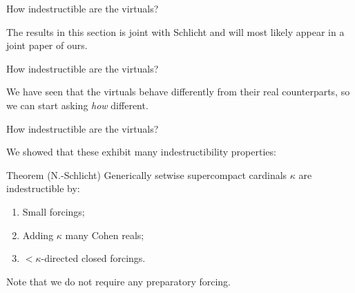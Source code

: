 \documentclass{beamer}
\begin{document}
\begin{frame}{How indestructible are the virtuals?}

  The results in this section is joint with \alert{Schlicht} and will most likely appear in a joint paper of ours.

\end{frame}

\begin{frame}{How indestructible are the virtuals?}

  We have seen that the virtuals behave differently from their real counterparts, so we can start asking \textit{how} different. 



\end{frame}

\begin{frame}{How indestructible are the virtuals?}

  We showed that these exhibit many indestructibility properties:

  \begin{block}{Theorem (N.-Schlicht)}
    Generically setwise supercompact cardinals $\kappa$ are indestructible by:
    \begin{enumerate}
      \item Small forcings;
      \item Adding $\kappa$ many Cohen reals;
      \item ${<}\kappa$-directed closed forcings.
    \end{enumerate}
  \end{block}

  Note that we do \alert{not} require any preparatory forcing.

\end{frame}
\end{document}

